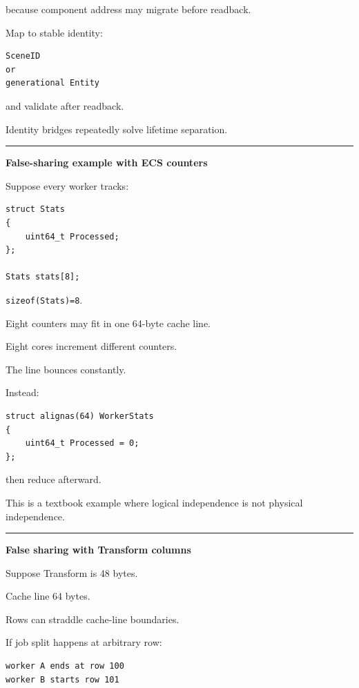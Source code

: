 because component address may migrate before readback.

Map to stable identity:

\begin{verbatim}
SceneID
or
generational Entity
\end{verbatim}

and validate after readback.

Identity bridges repeatedly solve lifetime separation.

\begin{center}\rule{0.5\linewidth}{0.5pt}\end{center}

\textbf{False-sharing example with ECS counters}

Suppose every worker tracks:

\begin{verbatim}
struct Stats
{
    uint64_t Processed;
};

Stats stats[8];
\end{verbatim}

\texttt{sizeof(Stats)=8}.

Eight counters may fit in one 64-byte cache line.

Eight cores increment different counters.

The line bounces constantly.

Instead:

\begin{verbatim}
struct alignas(64) WorkerStats
{
    uint64_t Processed = 0;
};
\end{verbatim}

then reduce afterward.

This is a textbook example where logical independence is not physical independence.

\begin{center}\rule{0.5\linewidth}{0.5pt}\end{center}

\textbf{False sharing with Transform columns}

Suppose Transform is 48 bytes.

Cache line 64 bytes.

Rows can straddle cache-line boundaries.

If job split happens at arbitrary row:

\begin{verbatim}
worker A ends at row 100
worker B starts row 101
\end{verbatim}

